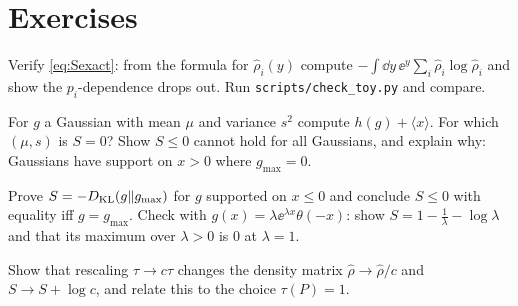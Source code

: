 \section*{Exercises}
\begin{exercise}
Verify \eqref{eq:Sexact}: from the formula for $\hat\rho_i(y)$ compute $-\int\dd y\,\ee^y\sum_i\hat\rho_i\log\hat\rho_i$ and show the $p_i$-dependence drops out. Run \texttt{scripts/check\_toy.py} and compare.
\end{exercise}
\begin{exercise}
For $g$ a Gaussian with mean $\mu$ and variance $s^2$ compute $h(g)+\langle x\rangle$. For which $(\mu,s)$ is $S=0$? Show $S\le0$ cannot hold for all Gaussians, and explain why: Gaussians have support on $x>0$ where $g_{\max}=0$.
\end{exercise}
\begin{exercise}
Prove $S=-D_{\rm KL}(g\|g_{\max})$ for $g$ supported on $x\le0$ and conclude $S\le0$ with equality iff $g=g_{\max}$. Check with $g(x)=\lambda\ee^{\lambda x}\theta(-x)$: show $S=1-\frac1\lambda-\log\lambda$ and that its maximum over $\lambda>0$ is $0$ at $\lambda=1$.
\end{exercise}
\begin{exercise}
Show that rescaling $\tau\to c\tau$ changes the density matrix $\hat\rho\to\hat\rho/c$ and $S\to S+\log c$, and relate this to the choice $\tau(P)=1$.
\end{exercise}
